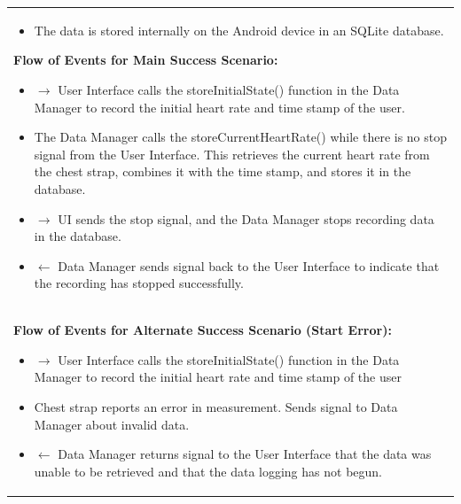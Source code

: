 \documentclass[letterpaper,english, 12pt]{scrreprt}
\begin{document}
\begin{center}
\begin{longtable}{|C{15cm}|}
\begin{itemize}
                                        \item The data is stored internally on the Android device in an SQLite database.
                                \end{itemize}
                        \begin{flushleft}
                                \textbf{Flow of Events for Main Success Scenario: }
                        \end{flushleft}
                                \begin{itemize}
                                        \item $\rightarrow$ User Interface calls the storeInitialState() function in the Data Manager to record the initial heart rate and time stamp of the user.
                                        \item The Data Manager calls the storeCurrentHeartRate() while there is no stop signal from the User Interface. This retrieves the current heart rate from the chest strap, combines it with the time stamp, and stores it in the database.
                                        \item $\rightarrow$ UI sends the stop signal, and the Data Manager stops recording data in the database.
                                        \item $\leftarrow$ Data Manager sends signal back to the User Interface to indicate that the recording has stopped successfully.
                               \end{itemize}
{{\bfseries}} \\
                        \begin{flushleft}
                                \textbf{Flow of Events for Alternate Success Scenario (Start Error): }
                        \end{flushleft}
                                \begin{itemize}
                                        \item $\rightarrow$ User Interface calls the storeInitialState() function in the Data Manager to record the initial heart rate and time stamp of the user
                                        \item Chest strap reports an error in measurement. Sends signal to Data Manager about invalid data.
                                        \item $\leftarrow$ Data Manager returns signal to the User Interface that the data was unable to be retrieved and that the data logging has not begun.

\end{itemize}
\end{longtable}
\end{center}
\end{document}
